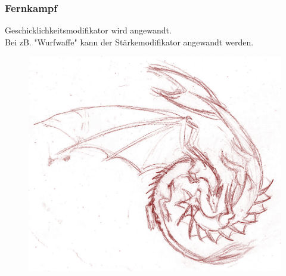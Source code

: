 \subsubsection{Fernkampf}
Geschicklichkeitsmodifikator wird angewandt.\\
Bei zB. "Wurfwaffe" kann der Stärkemodifikator angewandt werden.

\begin{figure}[h!]
  \centering
  \includegraphics[width=\textwidth / 2 ]{img/drachen}
\end{figure}

